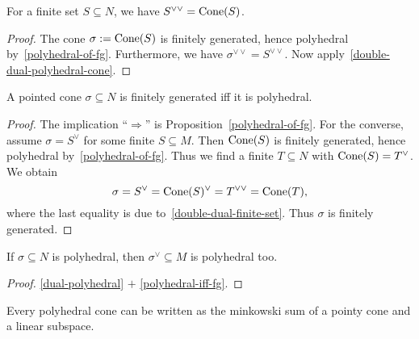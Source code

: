 \begin{proposition}
  \label{double-dual-finite-set}
  \uses{}
  For a finite set \( S \subseteq N \), we have \( S^{\vee\vee} =
  \operatorname{Cone}(S) \).
\end{proposition}
\begin{proof}
  The cone \( \sigma := \operatorname{Cone}(S) \) is finitely generated, hence
  polyhedral by~\ref{polyhedral-of-fg}. Furthermore, we have \(
  \sigma^{\vee\vee} = S^{\vee\vee} \). Now
  apply~\ref{double-dual-polyhedral-cone}.
\end{proof}

\begin{proposition}[Polyhedral = Finitely generated]
  \label{polyhedral-iff-fg}
  \uses{}
  A pointed cone \( \sigma \subseteq N \) is finitely generated iff it is
  polyhedral.
\end{proposition}
\begin{proof}
  The implication ``\( \Rightarrow \)'' is
  Proposition~\ref{polyhedral-of-fg}. For the converse, assume
  \( \sigma = S^{\vee} \) for some finite \( S \subseteq M \). Then \(
  \operatorname{Cone}(S) \) is finitely generated, hence polyhedral
  by~\ref{polyhedral-of-fg}. Thus we find a finite \( T
  \subseteq N \) with \( \operatorname{Cone}(S) = T^\vee \). We obtain
  \[
      \sigma = S^{\vee} = \operatorname{Cone}(S)^\vee = T^{\vee\vee} = \operatorname{Cone}(T),
  \]
  where the last equality is due
  to~\ref{double-dual-finite-set}. Thus \( \sigma \) is finitely
  generated.
\end{proof}

\begin{proposition}
  \label{dual-polyhedral-cone}
  If \( \sigma \subseteq N \) is
  polyhedral, then \( \sigma^\vee \subseteq M \) is polyhedral too.
\end{proposition}
\begin{proof}
  \ref{dual-polyhedral} \( + \) \ref{polyhedral-iff-fg}.
\end{proof}

\begin{proposition}
  \label{pointy-linear-sum-polyhedral-cone}
  Every polyhedral cone can be written as the minkowski sum of a pointy cone and a linear subspace.
\end{proposition} %


